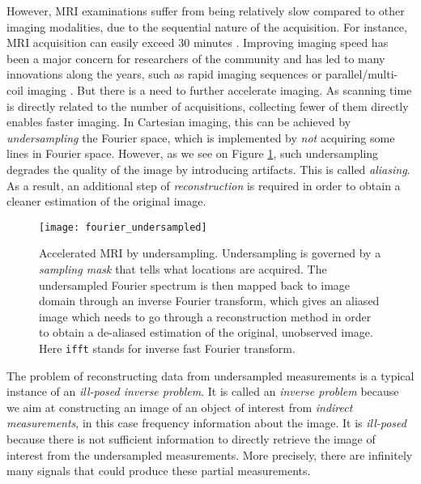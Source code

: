 However, MRI examinations suffer from being relatively slow compared to other imaging modalities, due to the sequential nature of the acquisition. For instance, MRI acquisition can easily exceed 30 minutes \citep{zbontarFastMRIOpenDataset2019}. Improving imaging speed has been a major concern for researchers of the community and has led to many innovations along the years, such as rapid imaging sequences \citep{frahm1986rapid,hennig1986rare} or parallel/multi-coil imaging \citep{sodickson1997simultaneous,pruessmann1999sense,griswold2002generalized}. But there is a need to further accelerate imaging. As scanning time is directly related to the number of acquisitions, collecting fewer of them directly enables faster imaging. In Cartesian imaging,
 this can be achieved by \textit{undersampling} the Fourier space, which is implemented by \textit{not} acquiring some lines in Fourier space. However, as we see on Figure \ref{fig:fourier_undersampled}, such undersampling degrades the quality of the image by introducing artifacts. This is called \textit{aliasing}. As a result, an additional step of \textit{reconstruction} is required in order to obtain a cleaner estimation of the original image. 

\begin{figure}[!ht]
    \centering
    \texttt{[image: fourier\_undersampled]}
    \caption{Accelerated MRI by undersampling. Undersampling is governed by a \textit{sampling mask} that tells what locations are acquired. The undersampled Fourier spectrum is then mapped back to image domain through an inverse Fourier transform, which gives an aliased image which needs to go through a reconstruction method in order to obtain a de-aliased estimation of the original, unobserved image. Here \texttt{ifft} stands for inverse fast Fourier transform.}\label{fig:fourier_undersampled}
\end{figure}

The problem of reconstructing data from undersampled measurements is a typical instance of an \textit{ill-posed inverse problem}. It is called an \textit{inverse problem} because we aim at constructing an image of an object of interest from \textit{indirect measurements}, in this case frequency information about the image. It is \textit{ill-posed} because there is not sufficient information to directly retrieve the image of interest from the undersampled measurements. More precisely, there are infinitely many signals that could produce these partial measurements.

